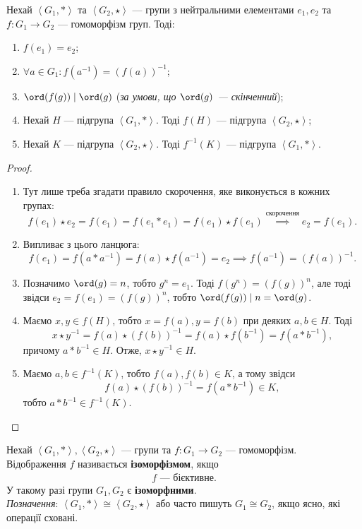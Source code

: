 \documentclass{math_library}
\begin{document}
\begin{theorem}
Нехай $\left<G_1, * \right>$ та $\left<G_2, \star \right>$ --- групи з нейтральними елементами $e_1,e_2$ та $f \colon G_1 \to G_2$ --- гомоморфізм груп. Тоді:
\begin{enumerate}[nosep,wide=0pt,label={\arabic*)}]
\item $f(e_1) = e_2$;
\item $\forall a \in G_1: f(a^{-1}) = (f(a))^{-1}$;
\item $\ord (f(g)) \mid \ord (g)$ (\textit{за умови, що $\ord (g)$ --- скінченний});
\item Нехай $H$ --- підгрупа $\left<G_1,*\right>$. Тоді $f(H)$ --- підгрупа $\left<G_2, \star \right>$;
\item Нехай $K$ --- підгрупа $\left<G_2, \star \right>$. Тоді $f^{-1}(K)$ --- підгрупа $\left<G_1,*\right>$.
\end{enumerate}
\end{theorem}

\begin{proof}
\begin{enumerate}[topsep=0pt,wide=0pt, label={\arabic*)}]
\item Тут лише треба згадати правило скорочення, яке виконується в кожних групах:
\[ f(e_1) \star e_2 = f(e_1) = f(e_1*e_1) = f(e_1) \star f(e_1) \overset{\text{скорочення}}{\implies} e_2 = f(e_1). \] 

\item Випливає з цього ланцюга:
\[ f(e_1) = f(a*a^{-1}) = f(a) \star f(a^{-1}) = e_2 \implies f(a^{-1}) = (f(a))^{-1}.
\]

\item Позначимо $\ord(g) = n$, тобто $g^n = e_1$. Тоді $f(g^n) = (f(g))^n$, але тоді звідси $e_2 = f(e_1) = (f(g))^n$, тобто $\ord (f(g)) \mid n = \ord (g)$.

\item Маємо $x,y \in f(H)$, тобто $x = f(a), y = f(b)$ при деяких $a,b \in H$. Тоді \[
x \star y^{-1} = f(a) \star (f(b))^{-1} = f(a) \star f(b^{-1}) = f(a*b^{-1}),
\] причому $a*b^{-1} \in H$. Отже, $x \star y^{-1} \in H$.

\item Маємо $a,b \in f^{-1}(K)$, тобто $f(a),f(b) \in K$, а тому звідси \[
f(a) \star (f(b))^{-1} = f(a * b^{-1}) \in K,
\] тобто $a*b^{-1} \in f^{-1}(K)$. \qedhere
\end{enumerate}
\end{proof}

\begin{definition}
Нехай $\left<G_1, * \right>, \left<G_2, \star \right>$ --- групи та $f \colon G_1 \to G_2$ --- гомоморфізм.\\
Відображення $f$ називається \textbf{ізоморфізмом}, якщо
\begin{align*}
f \text{ --- бієктивне}.
\end{align*}
У такому разі групи $G_1,G_2$ є \textbf{ізоморфними}.\\
\textit{Позначення}: $\left<G_1, * \right> \cong \left<G_2, \star \right>$ або часто пишуть $G_1 \cong G_2$, якщо ясно, які операції сховані.
\end{definition}
\end{document}
